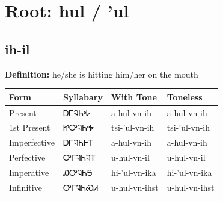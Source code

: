 \documentclass{article}%
\begin{document}
%
\normalsize%
\section*{Root: hul / 'ul}%
\subsection*{ih-il}%
\textbf{Definition: }%
he/she is hitting him/her on the mouth%
\\[0.5em]%
\begin{tabular}{|l|l|l|l|}%
\hline%
\textbf{Form}&\textbf{Syllabary}&\textbf{With Tone}&\textbf{Toneless}\\%
\hline%
Present&ᎠᎱᎸᏂᎭ&a{-}hul{-}vn{-}ih&a{-}hul{-}vn{-}ih\\%
1st Present&ᏥᎤᎸᏂᎭ&tsi{-}'ul{-}vn{-}ih&tsi{-}'ul{-}vn{-}ih\\%
Imperfective&ᎠᎱᎸᏂᎰᎢ&a{-}hul{-}vn{-}ih&a{-}hul{-}vn{-}ih\\%
Perfective&ᎤᎱᎸᏂᎸᎢ&u{-}hul{-}vn{-}il&u{-}hul{-}vn{-}il\\%
Imperative&ᎯᎤᎸᏂᎦ&hi{-}'ul{-}vn{-}ika&hi{-}'ul{-}vn{-}ika\\%
Infinitive&ᎤᎱᎸᏂᏍᏗ&u{-}hul{-}vn{-}ihst&u{-}hul{-}vn{-}ihst\\%
\hline%
\end{tabular}%
\\[1em]%
\end{document}
